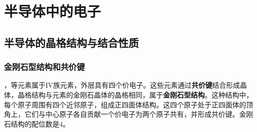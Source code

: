 \chapter{半导体中的电子}

\section{半导体的晶格结构与结合性质}

\subsection{金刚石型结构和共价键}

，等元素属于IV族元素，外层具有四个价电子。这些元素通过\textbf{共价键}结合形成晶体，晶格结构与元素的金刚石晶体的晶格相同，属于\textbf{金刚石型结构}。这种结构中，每个原子周围有四个近邻原子，组成正四面体结构。这四个原子处于正四面体的顶角上，它们与中心原子各自贡献一个价电子为两个原子共有，并形成共价键。金刚石结构的配位数是$4$。

